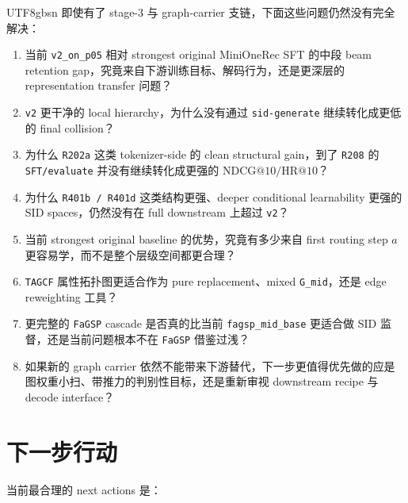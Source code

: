 \documentclass[11pt]{article}
\begin{document}
\begin{CJK*}{UTF8}{gbsn}
即使有了 stage-3 与 graph-carrier 支链，下面这些问题仍然没有完全解决：

\begin{enumerate}
  \item 当前 \texttt{v2\_on\_p05} 相对 strongest original MiniOneRec SFT 的中段 beam retention gap，究竟来自下游训练目标、解码行为，还是更深层的 representation transfer 问题？
  \item \texttt{v2} 更干净的 local hierarchy，为什么没有通过 \texttt{sid-generate} 继续转化成更低的 final collision？
  \item 为什么 \texttt{R202a} 这类 tokenizer-side 的 clean structural gain，到了 \texttt{R208} 的 \texttt{SFT/evaluate} 并没有继续转化成更强的 \(\mathrm{NDCG}@10 / \mathrm{HR}@10\)？
  \item 为什么 \texttt{R401b / R401d} 这类结构更强、deeper conditional learnability 更强的 SID spaces，仍然没有在 full downstream 上超过 \texttt{v2}？
  \item 当前 strongest original baseline 的优势，究竟有多少来自 first routing step \(a\) 更容易学，而不是整个层级空间都更合理？
  \item \texttt{TAGCF} 属性拓扑图更适合作为 pure replacement、mixed \texttt{G\_mid}，还是 edge reweighting 工具？
  \item 更完整的 \texttt{FaGSP} cascade 是否真的比当前 \texttt{fagsp\_mid\_base} 更适合做 SID 监督，还是当前问题根本不在 \texttt{FaGSP} 借鉴过浅？
  \item 如果新的 graph carrier 依然不能带来下游替代，下一步更值得优先做的应是图权重小扫、带推力的判别性目标，还是重新审视 downstream recipe 与 decode interface？
\end{enumerate}

\section{下一步行动}

当前最合理的 next actions 是：


\end{CJK*}
\end{document}
